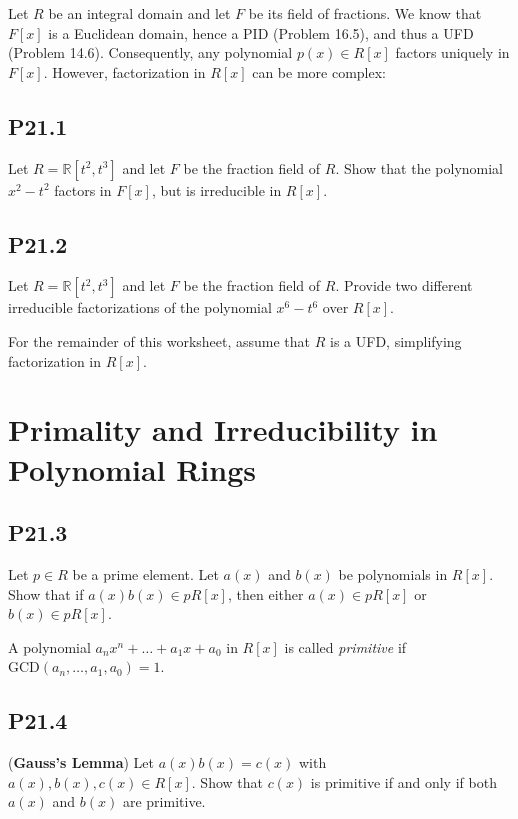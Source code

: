 \documentclass[lang=cn,11pt]{template}
\begin{document}
Let \( R \) be an integral domain and let \( F \) be its field of fractions. We know that \( F[x] \) is a Euclidean domain, hence a PID (Problem 16.5), and thus a UFD (Problem 14.6). Consequently, any polynomial \( p(x) \in R[x] \) factors uniquely in \( F[x] \). However, factorization in \( R[x] \) can be more complex:

\subsection*{P21.1} Let \( R = \mathbb{R}[t^2, t^3] \) and let \( F \) be the fraction field of \( R \). Show that the polynomial \( x^2 - t^2 \) factors in \( F[x] \), but is irreducible in \( R[x] \).

\subsection*{P21.2} Let \( R = \mathbb{R}[t^2, t^3] \) and let \( F \) be the fraction field of \( R \). Provide two different irreducible factorizations of the polynomial \( x^6 - t^6 \) over \( R[x] \).

For the remainder of this worksheet, assume that \( R \) is a UFD, simplifying factorization in \( R[x] \).

\section{Primality and Irreducibility in Polynomial Rings}

\subsection*{P21.3} Let \( p \in R \) be a prime element. Let \( a(x) \) and \( b(x) \) be polynomials in \( R[x] \). Show that if \( a(x)b(x) \in pR[x] \), then either \( a(x) \in pR[x] \) or \( b(x) \in pR[x] \).

\begin{definition}
A polynomial \( a_n x^n + \dots + a_1 x + a_0 \) in \( R[x] \) is called \textit{primitive} if \( \text{GCD}(a_n, \dots, a_1, a_0) = 1 \).
\end{definition}

\subsection*{P21.4} (\textbf{Gauss’s Lemma}) Let \( a(x) b(x) = c(x) \) with \( a(x), b(x), c(x) \in R[x] \). Show that \( c(x) \) is primitive if and only if both \( a(x) \) and \( b(x) \) are primitive.
\end{document}
